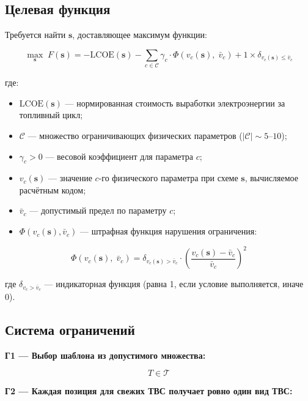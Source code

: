 \documentclass[12pt,a4paper]{article}
\begin{document}
\subsection*{Целевая функция}

Требуется найти $\mathbf{s}$, доставляющее максимум функции:

\begin{equation}
\max_{\mathbf{s}}\; F(\mathbf{s}) = -\mathrm{LCOE}(\mathbf{s}) - \sum_{c \in \mathcal{C}} \gamma_c \cdot \Phi\left(v_c(\mathbf{s}),\; \bar{v}_c\right) + 1 \times \delta_{v_c(\mathbf{s}) \leq \bar{v}_c}
\end{equation}

где:
\begin{itemize}
\item $\mathrm{LCOE}(\mathbf{s})$ --- нормированная стоимость выработки электроэнергии за топливный цикл;
\item $\mathcal{C}$ --- множество ограничивающих физических параметров ($|\mathcal{C}| \sim 5$--$10$);
\item $\gamma_c > 0$ --- весовой коэффициент для параметра $c$;
\item $v_c(\mathbf{s})$ --- значение $c$-го физического параметра при схеме $\mathbf{s}$, вычисляемое расчётным кодом;
\item $\bar{v}_c$ --- допустимый предел по параметру $c$;
\item $\Phi(v_c(\mathbf{s}), \bar{v}_c)$ --- штрафная функция нарушения ограничения:
\end{itemize}

\begin{equation}
\Phi\left(v_c(\mathbf{s}),\; \bar{v}_c\right) = \delta_{v_c(\mathbf{s}) > \bar{v}_c} \cdot \left(\frac{v_c(\mathbf{s}) - \bar{v}_c}{\bar{v}_c}\right)^2
\end{equation}

где $\delta_{v_c > \bar v_c}$ --- индикаторная функция (равна 1, если условие выполняется, иначе 0).

\subsection*{Система ограничений}

\textbf{Г1 --- Выбор шаблона из допустимого множества:}

\begin{equation}
T \in \mathcal{T}
\end{equation}

\textbf{Г2 --- Каждая позиция для свежих ТВС получает ровно один вид ТВС:}
\end{document}
